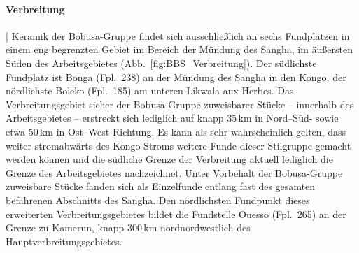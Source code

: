 \paragraph{Verbreitung}\hspace{-.5em}|\hspace{.5em}%
Keramik der Bobusa-Gruppe findet sich ausschließlich an sechs Fundplätzen in einem eng begrenzten Gebiet im Bereich der Mündung des \mbox{Sangha}, im äußersten Süden des Arbeitsgebietes (Abb.~\ref{fig:BBS_Verbreitung}). Der südlichste Fundplatz ist Bonga (Fpl.~238) an der Mündung des \mbox{Sangha} in den Kongo, der nördlichste Boleko (Fpl.~185) am unteren Likwala-aux-Herbes. Das Verbreitungsgebiet sicher der Bobusa-Gruppe zuweisbarer Stücke -- innerhalb des Arbeitsgebietes -- erstreckt sich lediglich auf knapp 35\,km in Nord--Süd- sowie etwa 50\,km in Ost--West-Richtung. Es kann als sehr wahrscheinlich gelten, dass weiter stromabwärts des Kongo-Stroms weitere Funde dieser Stilgruppe gemacht werden können und die südliche Grenze der Verbreitung aktuell lediglich die Grenze des Arbeitsgebietes nachzeichnet. Unter Vorbehalt der Bobusa-Gruppe zuweisbare Stücke fanden sich als Einzelfunde entlang fast des gesamten befahrenen Abschnitts des \mbox{Sangha}. Den nördlichsten Fundpunkt dieses erweiterten Verbreitungsgebietes bildet die Fundstelle Ouesso (Fpl.~265) an der Grenze zu Kamerun, knapp 300\,km nordnordwestlich des Hauptverbreitungsgebietes.